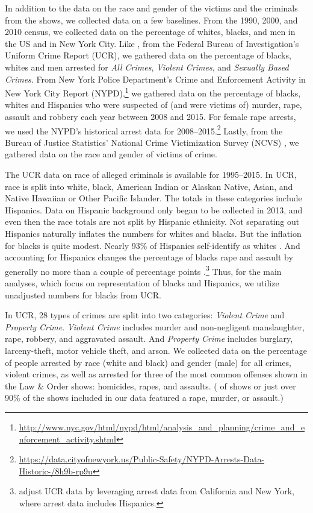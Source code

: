 \documentclass[11pt, letterpaper]{article}
\begin{document}
In addition to the data on the race and gender of the victims and the criminals from the shows, we collected data on a few baselines. From the 1990, 2000, and 2010 census, we collected data on the percentage of whites, blacks, and men in the US and in New York City. Like \citet{dixon2000overrepresentation}, from the Federal Bureau of Investigation's Uniform Crime Report (UCR), we gathered data on the percentage of blacks, whites and men arrested for \textit{All Crimes}, \textit{Violent Crimes}, and \textit{Sexually Based Crimes}. From New York Police Department's Crime and Enforcement Activity in New York City Report (NYPD),\footnote{\url{http://www.nyc.gov/html/nypd/html/analysis_and_planning/crime_and_enforcement_activity.shtml}} we gathered data on the percentage of blacks, whites and Hispanics who were suspected of (and were victims of) murder, rape, assault and robbery each year between 2008 and 2015. For female rape arrests, we used the NYPD's historical arrest data for 2008--2015.\footnote{\url{https://data.cityofnewyork.us/Public-Safety/NYPD-Arrests-Data-Historic-/8h9b-rp9u}} Lastly, from the Bureau of Justice Statistics' National Crime Victimization Survey (NCVS) \citep{powers2016national, victimization1998national}, we gathered data on the race and gender of victims of crime.

The UCR data on race of alleged criminals is available for 1995--2015. In UCR, race is split into white, black, American Indian or Alaskan Native, Asian, and Native Hawaiian or Other Pacific Islander. The totals in these categories include Hispanics. Data on Hispanic background only began to be collected in 2013, and even then the race totals are not split by Hispanic ethnicity. Not separating out Hispanics naturally inflates the numbers for whites and blacks. But the inflation for blacks is quite modest. Nearly 93\% of Hispanics self-identify as whites \citep{steffensmeier2011reassessing}. And accounting for Hispanics changes the percentage of blacks rape and assault by generally no more than a couple of percentage points \citep[see figure 4,][]{steffensmeier2011reassessing}.\footnote{\citet{steffensmeier2011reassessing} adjust UCR data by leveraging arrest data from California and New York, where arrest data includes Hispanics.} Thus, for the main analyses, which focus on representation of blacks and Hispanics, we utilize unadjusted numbers for blacks from UCR.

In UCR, 28 types of crimes are split into two categories: \textit{Violent Crime} and \textit{Property Crime}. \textit{Violent Crime} includes murder and non-negligent manslaughter, rape, robbery, and aggravated assault. And \textit{Property Crime} includes burglary, larceny-theft, motor vehicle theft, and arson. We collected data on the percentage of people arrested by race (white and black) and gender (male) for all crimes, violent crimes, as well as arrested for three of the most common offenses shown in the Law \& Order shows: homicides, rapes, and assaults. (\MajorCrimeEpisodeCount{} of \EpisodeCount{} shows or just over 90\% of the shows included in our data featured a rape, murder, or assault.)
\end{document}
